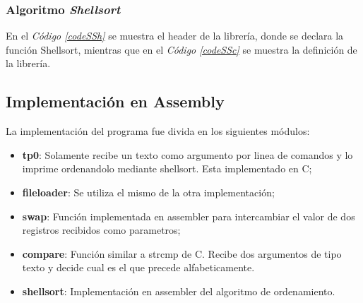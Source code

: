 \documentclass{article}
\newcommand{\refcode}[1]{\textit{Código \ref{#1}}}
\begin{document}
%  




\subsubsection{Algoritmo \textit{Shellsort}}

	En el \refcode{codeSSh} se muestra el header de la librería, donde se declara la función Shellsort, mientras que en el \refcode{codeSSc} se muestra la definición de la librería.

%  


%  
\bigskip\bigskip




\newpage
\subsection{Implementación en Assembly}

	La implementación del programa fue divida en los siguientes módulos:
	\medskip

\begin{itemize}

\itemsep=2pt \topsep=0pt \partopsep=0pt \parskip=0pt \parsep=0pt
	\item \textbf{tp0}: Solamente recibe un texto como argumento por linea de comandos y lo imprime ordenandolo mediante shellsort. Esta implementado en C;
	\item \textbf{fileloader}: Se utiliza el mismo de la otra implementación;
	\item \textbf{swap}: Función implementada en assembler para intercambiar el valor de dos registros recibidos como parametros;
	\item \textbf{compare}: Función similar a strcmp de C. Recibe dos argumentos de tipo texto y decide cual es el que precede alfabeticamente.
	\item \textbf{shellsort}: Implementación en assembler del algoritmo de ordenamiento.

\end{itemize}	
\medskip
\end{document}
